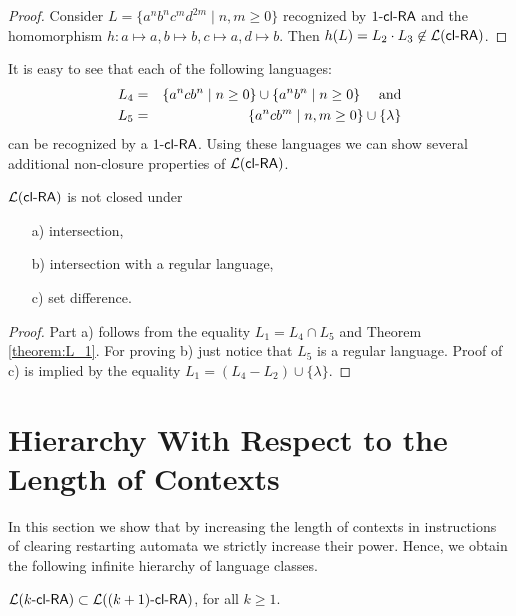 \begin{proof}
Consider $L = \{ a^n b^n c^m d^{2m} \mid n, m \ge 0 \}$ recognized by $\kclRA[1]$ and the homomorphism $h: a \mapsto a, b \mapsto b, c \mapsto a, d \mapsto b$. Then $h(L) = L_2 \cdot L_3 \not\in \calL{\clRA}$.
\end{proof}

It is easy to see that each of the following languages:
    \begin{eqnarray*}
        L_4 & = & \{a^ncb^n \mid n \ge 0\} \cup \{a^nb^n \mid n \ge 0\}\quad \textup{ and} \\
        L_5 & = & \{a^ncb^m \mid n, m \ge 0\} \cup \{\lambda\}
    \end{eqnarray*}
can be recognized by a $\kclRA[1]$. Using these languages we can show several additional non-closure properties of $\calL{\clRA}$.

\begin{corollary}
$\calL{\clRA}$ is not closed under
\begin{itemize}
    \item[a)]
        intersection,
    \item[b)]
        intersection with a regular language,
    \item[c)]
        set difference.
\end{itemize}
\end{corollary}

\begin{proof}
Part a) follows from the equality $L_1 = L_4 \cap L_5$ and Theorem \ref{theorem:L_1}. For proving b) just notice that $L_5$ is a regular language. Proof of c) is implied by the equality $L_1 = (L_4 - L_2) \cup \{ \lambda \}$.
\end{proof}

\section{Hierarchy With Respect to the Length of Contexts}
\label{se:k-hierarchy_k-cl-RA}

In this section we show that by increasing the length of contexts in instructions of clearing restarting automata we strictly increase their power. Hence, we obtain the following infinite hierarchy of language classes.

\begin{theorem}
$\calL{\kclRA} \subset \calL{\kclRA[(k+1)]}$, for all $k\ge 1$.
\end{theorem}

